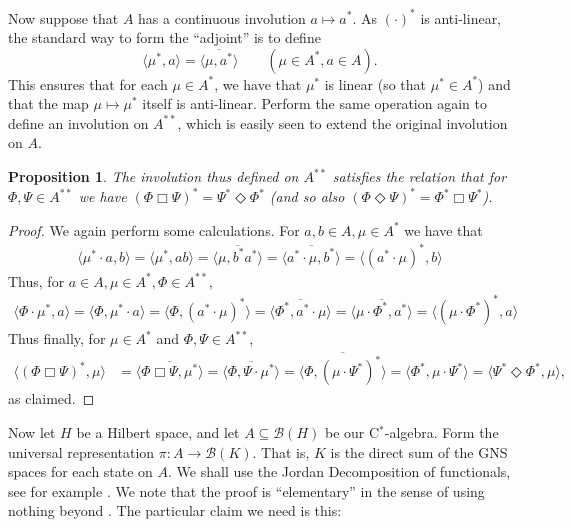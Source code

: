 \documentclass[a4paper,12pt]{article}
\theoremstyle{plain}
\newtheorem{proposition}{Proposition}[section]
\theoremstyle{definition}
\newcommand{\mc}{\mathcal}
\newcommand{\ip}[2]{\langle{#1},{#2}\rangle}
\newcommand{\aone}{\Box}
\newcommand{\atwo}{\Diamond}
\begin{document}
Now suppose that $A$ has a continuous involution $a\mapsto a^*$.  As $(\cdot)^*$ is
anti-linear, the standard way to form the ``adjoint'' is to define
\[ \ip{\mu^*}{a} = \overline{\ip{\mu}{a^*}} \qquad (\mu\in A^*, a\in A). \]
This ensures that for each $\mu\in A^*$, we have that $\mu^*$ is linear (so that
$\mu^*\in A^*$) and that the map $\mu\mapsto\mu^*$ itself is anti-linear.  Perform
the same operation again to define an involution on $A^{**}$, which is easily seen
to extend the original involution on $A$.

\begin{proposition}\label{prop:three}
The involution thus defined on $A^{**}$ satisfies the relation that for
$\Phi,\Psi\in A^{**}$ we have $(\Phi\aone\Psi)^* = \Psi^* \atwo \Phi^*$
(and so also $(\Phi\atwo\Psi)^* = \Phi^* \aone \Psi^*$).
\end{proposition}
\begin{proof}
We again perform some calculations.  For $a,b\in A, \mu\in A^*$ we have that
\begin{align*}
\ip{\mu^*\cdot a}{b} = \ip{\mu^*}{ab} = \overline{\ip{\mu}{b^* a^*}}
= \overline{\ip{a^*\cdot\mu}{b^*}} = \ip{(a^*\cdot\mu)^*}{b}
\end{align*}
Thus, for $a\in A, \mu\in A^*, \Phi\in A^{**}$,
\begin{align*}
\ip{\Phi\cdot\mu^*}{a} = \ip{\Phi}{\mu^*\cdot a} = \ip{\Phi}{(a^*\cdot\mu)^*}
= \overline{\ip{\Phi^*}{a^*\cdot\mu}} = \overline{\ip{\mu\cdot\Phi^*}{a^*}}
= \ip{(\mu\cdot\Phi^*)^*}{a}
\end{align*}
Thus finally, for $\mu\in A^*$ and $\Phi,\Psi\in A^{**}$,
\begin{align*}
\ip{(\Phi\aone\Psi)^*}{\mu} &= \overline{\ip{\Phi\aone\Psi}{\mu^*}}
= \overline{\ip{\Phi}{\Psi\cdot\mu^*}} = \overline{\ip{\Phi}{(\mu\cdot\Psi^*)^*}}
= \ip{\Phi^*}{\mu\cdot\Psi^*} = \ip{\Psi^* \atwo \Phi^*}{\mu},
\end{align*}
as claimed.
\end{proof}

Now let $H$ be a Hilbert space, and let $A\subseteq\mc B(H)$ be our C$^*$-algebra.
Form the universal representation $\pi:A\rightarrow\mc B(K)$.  That is, $K$ is the
direct sum of the GNS spaces for each state on $A$.  We shall use the Jordan
Decomposition of functionals, see for example \cite[Chapter~III, Proposition~2.1]{tak1}.
We note that the proof is ``elementary'' in the sense of using nothing beyond
\cite[Chapter~I]{tak1}.  The particular claim we need is this:
\end{document}
